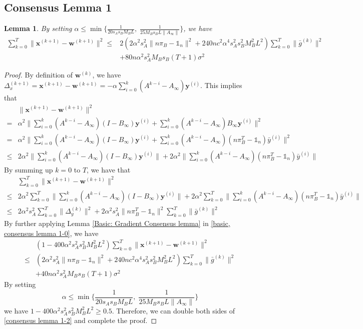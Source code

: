 \documentclass{article}
\newtheorem{lemma}[thm]{Lemma}
\newcommand{\vw}{{\mathbf{w}}}
\newcommand{\vx}{{\mathbf{x}}}
\newcommand{\vy}{{\mathbf{y}}}
\newcommand{\norm}[1]{\| #1 \|}
\newcommand{\one}{\mathds{1}_n}
\begin{document}
\subsection{Consensus Lemma 1}
\begin{lemma}\label{basic: Consensus Lemma 1}
  By setting $\alpha \leq \min\{\frac{1}{20s_As_BM_BL},\; \frac{1}{25M_Bs_BL\norm{A_{\infty}}}\}$, we have
  \begin{align*}
    \sum_{k=0}^T\norm{\vx^{(k+1)}-\vw^{(k+1)}}^2\nonumber 
  \leq &2\left(2\alpha^2s_A^2\norm{n\pi_B-\one}^2+240nc^2\alpha^4s_A^2s_B^2M_B^2L^2\right) \sum_{k=0}^T\norm{\bar{g}^{(k)}}^2\nonumber\\ &+80n\alpha^2s_A^2M_Bs_B(T+1)\sigma^2
  \end{align*}
\end{lemma}
\begin{proof}
By definition of $\vw^{(k)}$, we have $\Delta_{x}^{(k+1)}=\vx^{(k+1)}-\vw^{(k+1)}=-\alpha\sum_{i=0}^k(A^{k-i}-A_{\infty})\vy^{(i)}$. This implies that
\begin{align*}
&\norm{\vx^{(k+1)}-\vw^{(k+1)}}^2\\ 
=&\alpha^2 \norm{\sum_{i=0}^k(A^{k-i}-A_{\infty})(I-B_{\infty})\vy^{(i)}+\sum_{i=0}^k(A^{k-i}-A_{\infty})B_{\infty}\vy^{(i)}}^2\\ 
=&\alpha^2 \norm{\sum_{i=0}^k(A^{k-i}-A_{\infty})(I-B_{\infty})\vy^{(i)}+\sum_{i=0}^k(A^{k-i}-A_{\infty})(n\pi_{B}^T-\one)\bar{y}^{(i)}}^2\\ 
\leq&2\alpha^2\norm{\sum_{i=0}^k(A^{k-i}-A_{\infty})(I-B_{\infty})\vy^{(i)}}+2\alpha^2\norm{\sum_{i=0}^k(A^{k-i}-A_{\infty})(n\pi_{B}^T-\one)\bar{y}^{(i)}}
\end{align*}
By summing up $k=0$ to $T$, we have that
\begin{align}
&\sum_{k=0}^T\norm{\vx^{(k+1)}-\vw^{(k+1)}}^2\nonumber\\ 
\leq& 2\alpha^2\sum_{k=0}^T\norm{\sum_{i=0}^k(A^{k-i}-A_{\infty})(I-B_{\infty})\vy^{(i)}}+2\alpha^2\sum_{k=0}^T\norm{\sum_{i=0}^k(A^{k-i}-A_{\infty})(n\pi_{B}^T-\one)\bar{y}^{(i)}}\nonumber\\ 
\leq& 2\alpha^2s_{A}^2\sum_{k=0}^T \norm{\Delta_{y}^{(k)}}^2+2\alpha^2s_{A}^2\norm{n\pi_{B}^T-\one}^2\sum_{k=0}^T\norm{\bar{g}^{(k)}}^2\label{basic, consensus lemma 1-0}
\end{align}
By further applying Lemma \ref{Basic: Gradient Consensus lemma} in \ref{basic, consensus lemma 1-0}, we have
\begin{align}
  &\left(1-400\alpha^2s_A^2s_B^2M_B^2L^2\right)\sum_{k=0}^T\norm{\vx^{(k+1)}-\vw^{(k+1)}}^2\nonumber\\ 
  \leq &\left(2\alpha^2s_A^2\norm{n\pi_B-\one}^2+240nc^2\alpha^4s_A^2s_B^2M_B^2L^2\right) \sum_{k=0}^T\norm{\bar{g}^{(k)}}^2\nonumber\\ &+40n\alpha^2s_A^2M_Bs_B(T+1)\sigma^2\label{consensus lemma 1-2}
\end{align}
By setting 
$$\alpha \leq \min\{\frac{1}{20s_As_BM_BL},\; \frac{1}{25M_Bs_BL\norm{A_{\infty}}}\} $$
we have $1-400\alpha^2s_A^2s_B^2M_B^2L^2\geq 0.5$. Therefore, we can double both sides of \ref{consensus lemma 1-2} and complete the proof.
\end{proof}
\end{document}
